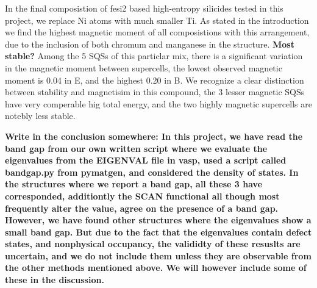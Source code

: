 In the final composistion of fesi2 based high-entropy silicides tested in this project, we replace Ni atoms with much smaller Ti. As stated in the introduction we find the highest magnetic moment of all composistions with this arrangement, due to the inclusion of both chromum and manganese in the structure. \textbf{Most stable?} Among the 5 SQSs of this particlar mix, there is a significant variation in the magnetic moment between supercells, the lowest observed magnetic moment is 0.04 in E, and the highest 0.20 in B. We recognize a clear distinction between stability and magnetisim in this compound, the 3 lesser magnetic SQSs have very comperable hig total energy, and the two highly magnetic supercells are notebly less stable. 


\textbf{Write in the conclusion somewhere: In this project, we have read the band gap from our own written script where we evaluate the eigenvalues from the EIGENVAL file in vasp, used a script called bandgap.py from pymatgen, and considered the density of states. In the structures where we report a band gap, all these 3 have corresponded, additiontly the SCAN functional all though most frequently alter the value, agree on the presence of a band gap. However, we have found other structures where the eigenvalues show a small band gap. But due to the fact that the eigenvalues contain defect states, and nonphysical occupancy, the valididty of these resuslts are uncertain, and we do not include them unless they are observable from the other methods mentioned above. We will however include some of these in the discussion. }
